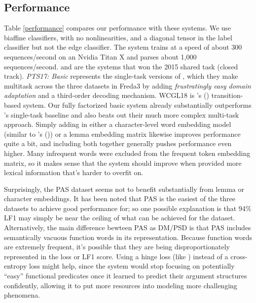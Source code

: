 \documentclass[11pt,a4paper]{article}
\newcommand{\citea}[1]{\citeauthor{#1}'s (\citeyear{#1})}
\begin{document}
\subsection{Performance}
Table \ref{performance} compares our performance with these systems. We use biaffine classifiers, with no nonlinearities, and a diagonal tensor in the label classifier but not the edge classifier. The system trains at a speed of about 300 sequences/second on an Nvidia Titan X and parses about 1,000 sequences/second. \citet{Duetal2015} and \citet{AlmeidaMartins2015} are the systems that won the 2015 shared task (closed track). \emph{PTS17: Basic} represents the single-task versions of \citet{PengThomsonSmith2017}, which they make multitask across the three datasets in Freda3 by adding \emph{frustratingly easy domain adaptation} \citep{DaumeIII2007,KimStratosSarikaya2016} and a third-order decoding mechanism. WCGL18 is \citea{Wangetal2018} transition-based system. Our fully factorized basic system already substantially outperforms \citeauthor{PengThomsonSmith2017}'s single-task baseline and also beats out their much more complex multi-task approach. Simply adding in either a character-level word embedding model (similar to \citea{DozatQiManning2017}) or a lemma embedding matrix likewise improves performance quite a bit, and including both together generally pushes performance even higher. Many infrequent words were excluded from the frequent token embedding matrix, so it makes sense that the system should improve when provided more lexical information that's harder to overfit on.

Surprisingly, the PAS dataset seems not to benefit substantially from lemma or character embeddings.
It has been noted that PAS is the easiest of the three datasets to achieve good performance for; so one possible explanation is that 94\%{} LF1 may simply be near the ceiling of what can be achieved for the dataset. Alternatively, the main difference bewteen PAS as DM/PSD is that PAS includes semantically vacuous function words in its representation. Because function words are extremely frequent, it's possible that they are being disproportionately represented in the loss or LF1 score. Using a hinge loss (like \citet{PengThomsonSmith2017}) instead of a cross-entropy loss might help, since the system would stop focusing on potentially ``easy'' functional predicates once it learned to predict their argument structures confidently, allowing it to put more resources into modeling more challenging phenomena.
\end{document}
